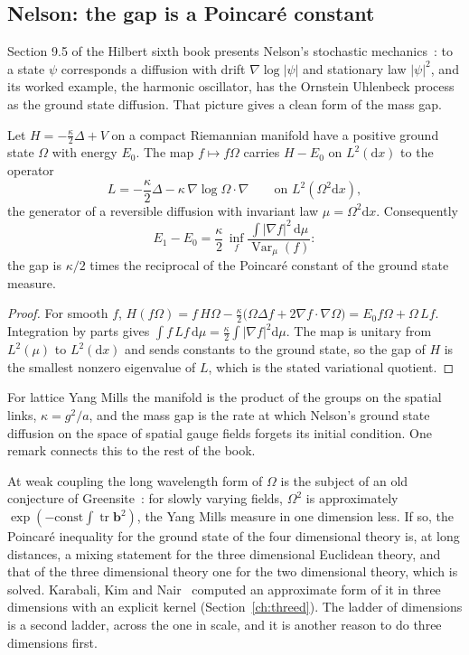 \subsection{Nelson: the gap is a Poincar\'e constant}

Section 9.5 of the Hilbert sixth book presents Nelson's stochastic mechanics~\cite{Ne66}: to a state $\psi$ corresponds a diffusion with drift $\nabla\log|\psi|$ and stationary law $|\psi|^2$, and its worked example, the harmonic oscillator, has the Ornstein Uhlenbeck process as the ground state diffusion. That picture gives a clean form of the mass gap.

\begin{proposition}\label{prop:groundstate}
Let $H=-\frac{\kappa}{2}\Delta+V$ on a compact Riemannian manifold have a positive ground state $\Omega$ with energy $E_0$. The map $f\mapsto f\Omega$ carries $H-E_0$ on $L^2(\mathrm dx)$ to the operator
\[
L=-\frac\kappa2\Delta-\kappa\,\nabla\log\Omega\cdot\nabla\qquad\text{on }L^2(\Omega^2\mathrm dx),
\]
the generator of a reversible diffusion with invariant law $\mu=\Omega^2\mathrm dx$. Consequently
\[
E_1-E_0=\frac\kappa2\,\inf_f\frac{\int|\nabla f|^2\,\mathrm d\mu}{\operatorname{Var}_\mu(f)} :
\]
the gap is $\kappa/2$ times the reciprocal of the Poincar\'e constant of the ground state measure.
\end{proposition}

\begin{proof}
For smooth $f$, $H(f\Omega)=f\,H\Omega-\frac\kappa2\big(\Omega\Delta f+2\nabla f\cdot\nabla\Omega\big)=E_0f\Omega+\Omega\,Lf$. Integration by parts gives $\int f\,Lf\,\mathrm d\mu=\frac\kappa2\int|\nabla f|^2\mathrm d\mu$. The map is unitary from $L^2(\mu)$ to $L^2(\mathrm dx)$ and sends constants to the ground state, so the gap of $H$ is the smallest nonzero eigenvalue of $L$, which is the stated variational quotient.
\end{proof}

For lattice Yang Mills the manifold is the product of the groups on the spatial links, $\kappa=g^2/a$, and the mass gap is the rate at which Nelson's ground state diffusion on the space of spatial gauge fields forgets its initial condition. One remark connects this to the rest of the book.

At weak coupling the long wavelength form of $\Omega$ is the subject of an old conjecture of Greensite~\cite{Gr79}: for slowly varying fields, $\Omega^2$ is approximately $\exp(-\mathrm{const}\int\operatorname{tr}\mathbf b^2)$, the Yang Mills measure in one dimension less. If so, the Poincar\'e inequality for the ground state of the four dimensional theory is, at long distances, a mixing statement for the three dimensional Euclidean theory, and that of the three dimensional theory one for the two dimensional theory, which is solved. Karabali, Kim and Nair~\cite{KKN} computed an approximate form of it in three dimensions with an explicit kernel (Section~\ref{ch:threed}). The ladder of dimensions is a second ladder, across the one in scale, and it is another reason to do three dimensions first.

